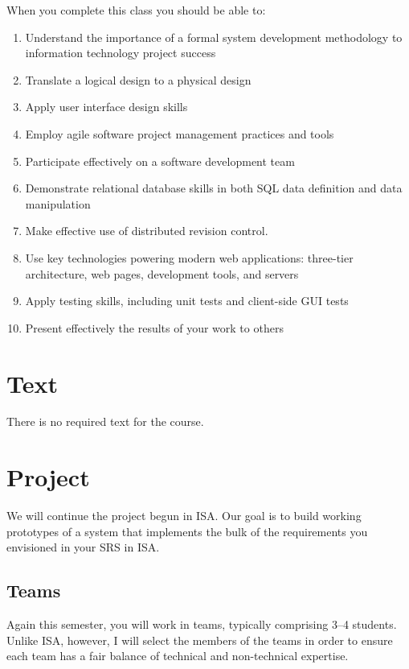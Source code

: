 \documentclass[11pt]{article}
\begin{document}
When you complete this class you should be able to:
\begin{enumerate}
\item Understand the importance
  of a formal system development methodology
  to information technology project success
\item Translate a logical design to a physical design
\item Apply user interface design skills
\item Employ agile software project management practices and tools
\item Participate effectively on a software development team
\item Demonstrate relational database skills
  in both SQL data definition and data manipulation
\item Make effective use of distributed revision control.
\item Use key technologies powering modern web applications:
  three-tier architecture, web pages,
  development tools, and servers
\item Apply testing skills,
  including unit tests and client-side GUI tests
\item Present effectively the results of your work to others
\end{enumerate}

\section{Text}

There is no required text for the course.

\section{Project}

We will continue the project begun in ISA.
Our goal is to build working prototypes
of a system that implements the bulk of the requirements
you envisioned in your SRS in ISA.

\subsection{Teams}

Again this semester, you will work in teams,
typically comprising 3--4 students.
Unlike ISA, however, I will select the members of the teams
in order to ensure each team has a fair balance
of technical and non-technical expertise.
\end{document}
